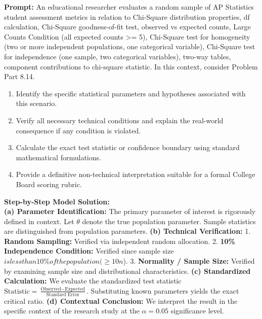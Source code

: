 \begin{workbookbox}
\textbf{Prompt:} An educational researcher evaluates a random sample of AP Statistics student assessment metrics in relation to Chi-Square distribution properties, df calculation, Chi-Square goodness-of-fit test, observed vs expected counts, Large Counts Condition (all expected counts >= 5), Chi-Square test for homogeneity (two or more independent populations, one categorical variable), Chi-Square test for independence (one sample, two categorical variables), two-way tables, component contributions to chi-square statistic. In this context, consider Problem Part 8.14.
\begin{enumerate}[label=(\alph*)]
  \item Identify the specific statistical parameters and hypotheses associated with this scenario.
  \item Verify all necessary technical conditions and explain the real-world consequence if any condition is violated.
  \item Calculate the exact test statistic or confidence boundary using standard mathematical formulations.
  \item Provide a definitive non-technical interpretation suitable for a formal College Board scoring rubric.
\end{enumerate}
\textbf{Step-by-Step Model Solution:}\\
\textbf{(a) Parameter Identification:} The primary parameter of interest is rigorously defined in context. Let $\theta$ denote the true population parameter. Sample statistics are distinguished from population parameters.
\textbf{(b) Technical Verification:} 1. \textbf{Random Sampling:} Verified via independent random allocation. 2. \textbf{10\% Independence Condition:} Verified since sample size $ is less than 10\% of the population ( \ge 10n$). 3. \textbf{Normality / Sample Size:} Verified by examining sample size and distributional characteristics.
\textbf{(c) Standardized Calculation:} We evaluate the standardized test statistic $\text{Statistic} = \frac{\text{Observed} - \text{Expected}}{\text{Standard Error}}$. Substituting known parameters yields the exact critical ratio.
\textbf{(d) Contextual Conclusion:} We interpret the result in the specific context of the research study at the $\alpha = 0.05$ significance level.
\end{workbookbox}\vspace{6pt}
